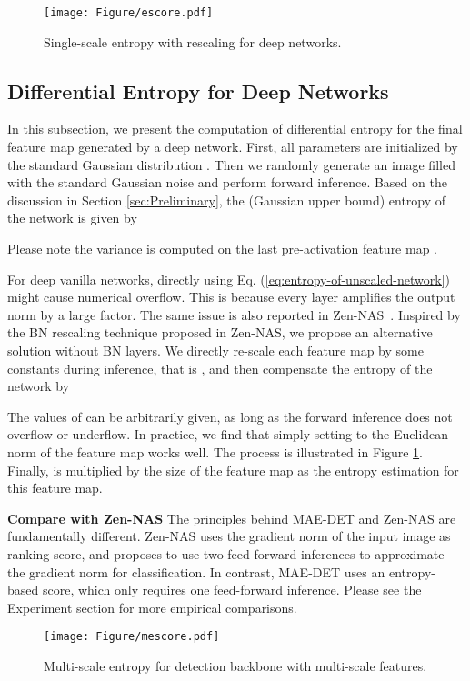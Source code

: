 \documentclass[nohyperref]{article}
\theoremstyle{plain}
\theoremstyle{definition}
\theoremstyle{remark}
\begin{document}
\begin{figure}[htb]
	\centering
	\texttt{[image: Figure/escore.pdf]}
	\caption{Single-scale entropy with rescaling for deep networks.}
	\label{fig:escore}	
\end{figure}

\subsection{Differential Entropy for Deep Networks}
In this subsection, we present the computation of differential entropy for the final feature map generated by a deep network. First, all parameters are initialized by the standard Gaussian distribution . Then we randomly generate an image filled with the standard Gaussian noise and perform forward inference. Based on the discussion in Section \ref{sec:Preliminary}, the (Gaussian upper bound) entropy  of the network  is given by

Please note the variance is computed on the last pre-activation feature map .

For deep vanilla networks, directly using Eq. (\ref{eq:entropy-of-unscaled-network}) might cause numerical overflow. This is because every layer amplifies the output norm by a large factor. The same issue is also reported in Zen-NAS~\citep{zennas}. Inspired by the BN rescaling technique proposed in Zen-NAS, we propose an alternative solution without BN layers. We directly re-scale each feature map  by some constants  during inference, that is , and then compensate the entropy of the network by

 
The values of  can be arbitrarily given, as long as the forward inference does not overflow or underflow. In practice, we find that simply setting  to the Euclidean norm of the feature map works well. The process is illustrated in Figure \ref{fig:escore}. Finally,  is multiplied by the size of the feature map as the entropy estimation for this feature map.

\noindent\textbf{Compare with Zen-NAS} The principles behind MAE-DET and Zen-NAS are fundamentally different. 
Zen-NAS uses the gradient norm of the input image as ranking score, and proposes to use two feed-forward inferences to approximate the gradient norm for classification. In contrast, MAE-DET uses an entropy-based score, which only requires one feed-forward inference. Please see the Experiment section for more empirical comparisons.


\begin{figure}[tb]
	\centering
	\texttt{[image: Figure/mescore.pdf]}
	\caption{Multi-scale entropy for detection backbone with multi-scale features.}
	\label{fig:mescore}	
\end{figure}
\end{document}
